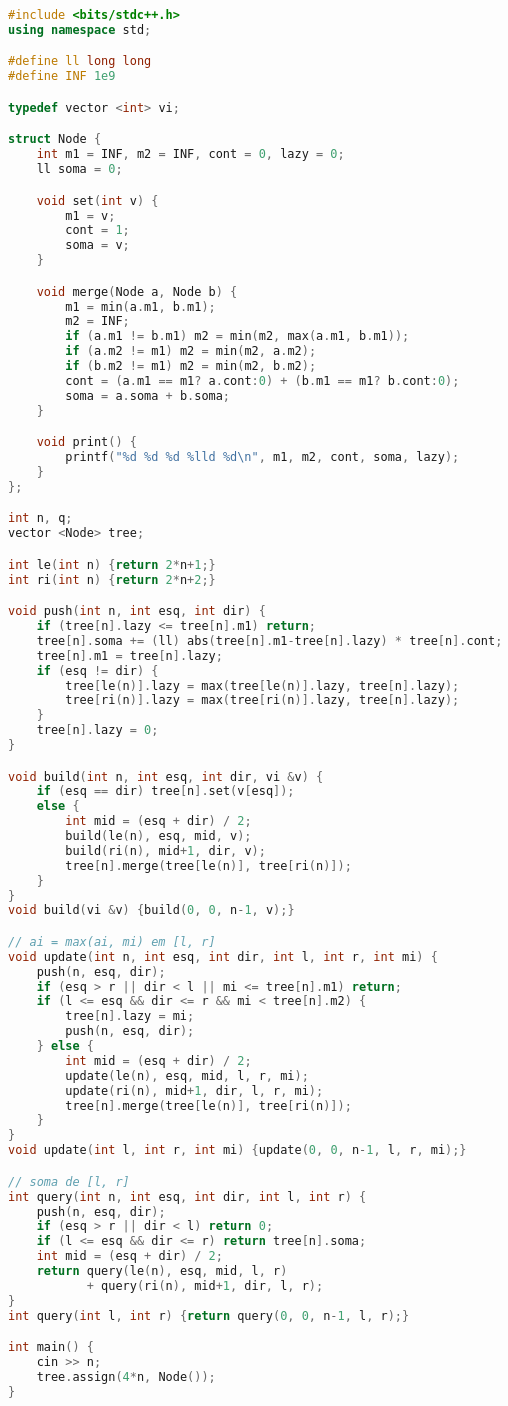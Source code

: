 \documentclass[11pt, a4paper, twoside]{article}
\begin{document}
\begin{lstlisting}[language=C++]
#include <bits/stdc++.h>
using namespace std;

#define ll long long
#define INF 1e9

typedef vector <int> vi;

struct Node {
    int m1 = INF, m2 = INF, cont = 0, lazy = 0;
    ll soma = 0;

    void set(int v) {
        m1 = v;
        cont = 1;
        soma = v;
    }

    void merge(Node a, Node b) {
        m1 = min(a.m1, b.m1);
        m2 = INF;
        if (a.m1 != b.m1) m2 = min(m2, max(a.m1, b.m1));
        if (a.m2 != m1) m2 = min(m2, a.m2);
        if (b.m2 != m1) m2 = min(m2, b.m2);
        cont = (a.m1 == m1? a.cont:0) + (b.m1 == m1? b.cont:0);
        soma = a.soma + b.soma;
    }

    void print() {
        printf("%d %d %d %lld %d\n", m1, m2, cont, soma, lazy);
    }
};

int n, q;
vector <Node> tree;

int le(int n) {return 2*n+1;}
int ri(int n) {return 2*n+2;}

void push(int n, int esq, int dir) {
    if (tree[n].lazy <= tree[n].m1) return;
    tree[n].soma += (ll) abs(tree[n].m1-tree[n].lazy) * tree[n].cont;
    tree[n].m1 = tree[n].lazy;
    if (esq != dir) {
        tree[le(n)].lazy = max(tree[le(n)].lazy, tree[n].lazy);
        tree[ri(n)].lazy = max(tree[ri(n)].lazy, tree[n].lazy);
    }
    tree[n].lazy = 0;
}

void build(int n, int esq, int dir, vi &v) {
    if (esq == dir) tree[n].set(v[esq]);
    else {
        int mid = (esq + dir) / 2;
        build(le(n), esq, mid, v);
        build(ri(n), mid+1, dir, v);
        tree[n].merge(tree[le(n)], tree[ri(n)]);
    }
}
void build(vi &v) {build(0, 0, n-1, v);}

// ai = max(ai, mi) em [l, r]
void update(int n, int esq, int dir, int l, int r, int mi) {
    push(n, esq, dir);
    if (esq > r || dir < l || mi <= tree[n].m1) return;
    if (l <= esq && dir <= r && mi < tree[n].m2) {
        tree[n].lazy = mi;
        push(n, esq, dir);
    } else {
        int mid = (esq + dir) / 2;
        update(le(n), esq, mid, l, r, mi);
        update(ri(n), mid+1, dir, l, r, mi);
        tree[n].merge(tree[le(n)], tree[ri(n)]);
    }
}
void update(int l, int r, int mi) {update(0, 0, n-1, l, r, mi);}

// soma de [l, r]
int query(int n, int esq, int dir, int l, int r) {
    push(n, esq, dir);
    if (esq > r || dir < l) return 0;
    if (l <= esq && dir <= r) return tree[n].soma;
    int mid = (esq + dir) / 2;
    return query(le(n), esq, mid, l, r)
           + query(ri(n), mid+1, dir, l, r);
}
int query(int l, int r) {return query(0, 0, n-1, l, r);}

int main() {
    cin >> n;
    tree.assign(4*n, Node());
}
    
\end{lstlisting}
\end{document}
